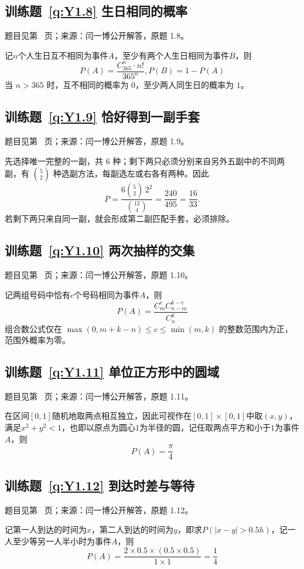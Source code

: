 \subsection*{训练题~\ref{q:Y1.8} 生日相同的概率}\label{a:Y1.8}{\small 题目见第~\pageref{q:Y1.8} 页；来源：闫一博公开解答，原题 1.8。}
\begin{solve}
记$n$个人生日互不相同为事件$A$，至少有两个人生日相同为事件$B$，则
\[P(A) = \frac{{C_{365}^n}\cdot n!}{{{{365}^n}}},P(B) = 1 - P(A)\]
 当 $n>365$ 时，互不相同的概率为 $0$，至少两人同生日的概率为 $1$。\end{solve}

\subsection*{训练题~\ref{q:Y1.9} 恰好得到一副手套}\label{a:Y1.9}{\small 题目见第~\pageref{q:Y1.9} 页；来源：闫一博公开解答，原题 1.9。}
\begin{solve}先选择唯一完整的一副，共 $6$ 种；剩下两只必须分别来自另外五副中的不同两副，有 $\binom52$ 种选副方法，每副选左或右各有两种。因此\[P=\frac{6\binom52\,2^2}{\binom{12}4}=\frac{240}{495}=\frac{16}{33}.\]若剩下两只来自同一副，就会形成第二副匹配手套，必须排除。\end{solve}

\subsection*{训练题~\ref{q:Y1.10} 两次抽样的交集}\label{a:Y1.10}{\small 题目见第~\pageref{q:Y1.10} 页；来源：闫一博公开解答，原题 1.10。}
\begin{solve}
记两组号码中恰有$c$个号码相同为事件$A$，则
\[P(A) = \frac{{C_m^cC_{n - m}^{k - c}}}{{C_n^k}}\]
 组合数公式仅在 $\max(0,m+k-n)\le c\le\min(m,k)$ 的整数范围内为正，范围外概率为零。\end{solve}

\subsection*{训练题~\ref{q:Y1.11} 单位正方形中的圆域}\label{a:Y1.11}{\small 题目见第~\pageref{q:Y1.11} 页；来源：闫一博公开解答，原题 1.11。}
\begin{solve}
在区间$[0,1]$随机地取两点相互独立，因此可视作在$[0,1]\times [0,1]$中取$(x,y)$，满足$x^2+y^2<1$，也即以原点为圆心$1$为半径的圆，记任取两点平方和小于$1$为事件$A$，则
\[
P(A)=\frac{\pi}{4}
\]
\end{solve}

\subsection*{训练题~\ref{q:Y1.12} 到达时差与等待}\label{a:Y1.12}{\small 题目见第~\pageref{q:Y1.12} 页；来源：闫一博公开解答，原题 1.12。}
\begin{solve}
记第一人到达的时间为$x$，第二人到达的时间为$y$，即求$P(|x-y|>0.5h)$，记一人至少等另一人半小时为事件$A$，则
\[P(A) = \frac{{2 \times 0.5 \times (0.5 \times 0.5)}}{1\times 1} = \frac{1}{4}\]
\end{solve}

